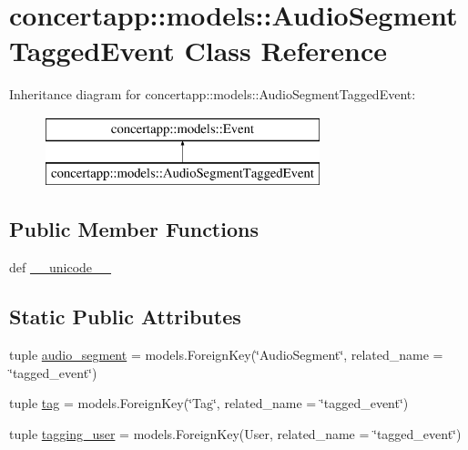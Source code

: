 \hypertarget{classconcertapp_1_1models_1_1_audio_segment_tagged_event}{
\section{concertapp::models::AudioSegmentTaggedEvent Class Reference}
\label{classconcertapp_1_1models_1_1_audio_segment_tagged_event}
}
Inheritance diagram for concertapp::models::AudioSegmentTaggedEvent:\begin{figure}[H]
\begin{center}
\leavevmode
\includegraphics[height=2.000000cm]{classconcertapp_1_1models_1_1_audio_segment_tagged_event}
\end{center}
\end{figure}
\subsection*{Public Member Functions}
\begin{DoxyCompactItemize}
\item 
def \hyperlink{classconcertapp_1_1models_1_1_audio_segment_tagged_event_a82d99ac415a4798f043e9c2db6f7b04d}{\_\-\_\-unicode\_\-\_\-}
\end{DoxyCompactItemize}
\subsection*{Static Public Attributes}
\begin{DoxyCompactItemize}
\item 
tuple \hyperlink{classconcertapp_1_1models_1_1_audio_segment_tagged_event_acb8c377922a19775d4440defd98b6097}{audio\_\-segment} = models.ForeignKey(\char`\"{}AudioSegment\char`\"{}, related\_\-name = \char`\"{}tagged\_\-event\char`\"{})
\item 
tuple \hyperlink{classconcertapp_1_1models_1_1_audio_segment_tagged_event_a54194571bbcf25ed56ae63b532881ba3}{tag} = models.ForeignKey(\char`\"{}Tag\char`\"{}, related\_\-name = \char`\"{}tagged\_\-event\char`\"{})
\item 
tuple \hyperlink{classconcertapp_1_1models_1_1_audio_segment_tagged_event_a3172b21716d3ebaf659246b197558de2}{tagging\_\-user} = models.ForeignKey(User, related\_\-name = \char`\"{}tagged\_\-event\char`\"{})
\end{DoxyCompactItemize}


